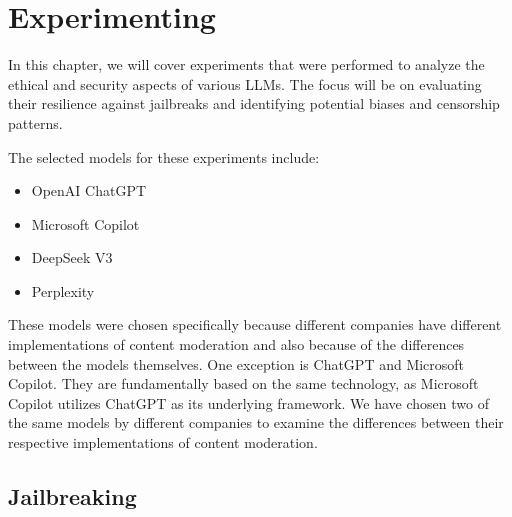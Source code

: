\chapter{Experimenting}


In this chapter, we will cover experiments that were performed to analyze the ethical and security aspects of various LLMs. The focus will be on evaluating their resilience against jailbreaks and identifying potential biases and censorship patterns.

The selected models for these experiments include:
\begin{itemize}
    \item OpenAI ChatGPT
    \item Microsoft Copilot
    \item DeepSeek V3
    \item Perplexity


    
\end{itemize}

These models were chosen specifically because different companies have different implementations of content moderation and also because of the differences between the models themselves. One exception is ChatGPT and Microsoft Copilot. They are fundamentally based on the same technology, as Microsoft Copilot utilizes ChatGPT as its underlying framework. We have chosen two of the same models by different companies to examine the differences between their respective implementations of content moderation.



\section{Jailbreaking}

